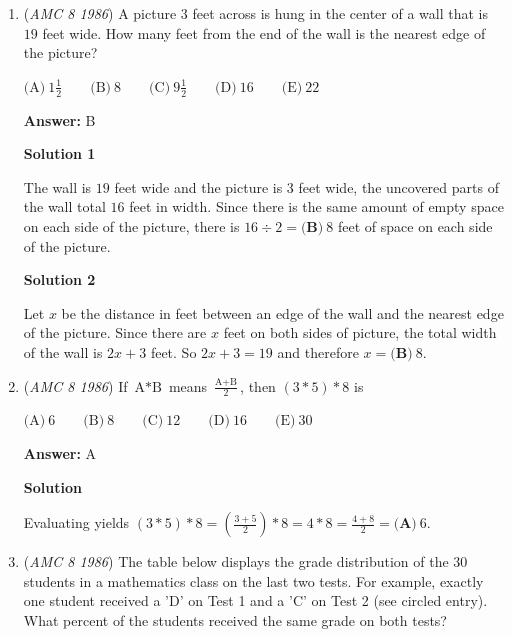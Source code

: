 \begin{enumerate}
 \textbf{Note} This is an example of a directed acyclic graph (DAG); it has no cycles (paths that start and end at the same point).  A topological sort of this graph is $M, B, A, D, C, N$.

 


	\item (\textit{AMC 8 1986}) A picture $3$ feet across is hung in the center of a wall that is $19$ feet wide.  How many feet from the end of the wall is the nearest edge of the picture?


 $\text{(A)}\ 1\frac{1}{2} \qquad \text{(B)}\ 8 \qquad \text{(C)}\ 9\frac{1}{2} \qquad \text{(D)}\ 16 \qquad \text{(E)}\ 22$

 \textbf{Answer: }B



\textbf{Solution 1}

The wall is $19$ feet wide and the picture is $3$ feet wide, the uncovered parts of the wall total $16$ feet in width.  Since there is the same amount of empty space on each side of the picture, there is $16 \div 2 = \boxed{\textbf{(B)}\ 8}$ feet of space on each side of the picture.

 



\textbf{Solution 2}

Let $x$ be the distance in feet between an edge of the wall and the nearest edge of the picture. Since there are $x$ feet on both sides of picture, the total width of the wall is $2x + 3$ feet.  So $2x + 3 = 19$ and therefore $x = \boxed{\textbf{(B)}\ 8}$.

 


	\item (\textit{AMC 8 1986}) If $\text{A}*\text{B}$ means $\frac{\text{A}+\text{B}}{2}$, then $(3*5)*8$ is


 $\text{(A)}\ 6 \qquad \text{(B)}\ 8 \qquad \text{(C)}\ 12 \qquad \text{(D)}\ 16\qquad \text{(E)}\ 30$

 \textbf{Answer: }A



\textbf{Solution}

Evaluating yields $(3*5)*8 = \left( \frac{3+5}{2}\right) * 8 = 4*8 = \frac{4+8}{2} = \boxed{\textbf{(A)}\ 6}$.

 


	\item (\textit{AMC 8 1986}) The table below displays the grade distribution of the $30$ students in a mathematics class on the last two tests.  For example, exactly one student received a 'D' on Test 1 and a 'C' on Test 2 (see circled entry).  What percent of the students received the same grade on both tests?



\end{enumerate}
